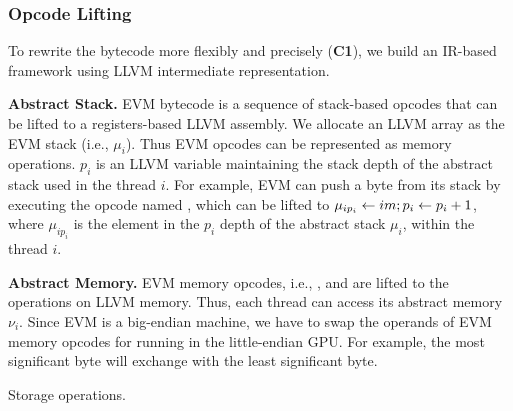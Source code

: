 
\subsubsection{Opcode Lifting}
To rewrite the bytecode more flexibly and precisely (\textbf{C1}), we build an IR-based framework using LLVM intermediate representation\cite{lattner2004llvm}.

\noindent\textbf{Abstract Stack.}
EVM bytecode is a sequence of stack-based opcodes that can be lifted to a registers-based LLVM assembly. 
We allocate an LLVM array as the EVM stack (i.e., $\mu_i$). 
Thus EVM opcodes can be represented as memory operations.
$p_i$ is an LLVM variable maintaining the stack depth of the abstract stack used in the thread $i$.
For example, EVM can push a byte from its stack by executing the opcode named , which can be lifted to $\mu_{ip_i} \gets \code{im}; p_i \gets p_i + 1$, where $\mu_{ip_i}$ is the element in the $p_i$ depth of the abstract stack $\mu_i$, within the thread $i$.


\noindent\textbf{Abstract Memory.}
EVM memory opcodes, i.e., ,  and  are lifted to the operations on LLVM memory. 
Thus, each thread can access its abstract memory $\nu_i$.
Since EVM is a big-endian machine, we have to swap the operands of EVM memory opcodes for running in the little-endian GPU.
For example, the most significant byte will exchange with the 
least significant byte.



\begin{algorithm}   
\caption{Storage operations.}
\label{algo:row_snapshot}
\BlankLine 

\BlankLine
{}
\end{algorithm}

